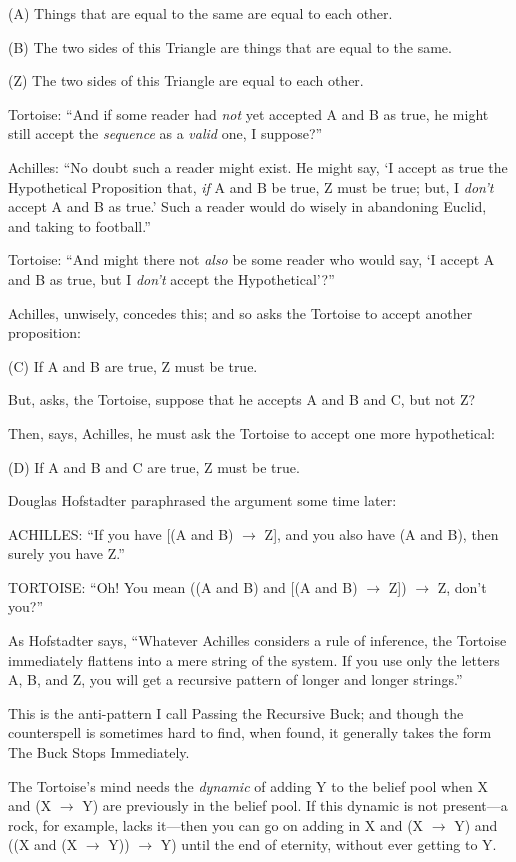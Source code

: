 {
 (A) Things that are equal to the same are equal to each other.}

{
 (B) The two sides of this Triangle are things that are equal to
the same.}

{
 (Z) The two sides of this Triangle are equal to each other.}

{
 Tortoise: ``And if some reader had \textit{not}
yet accepted A and B as true, he might still accept the
\textit{sequence} as a \textit{valid} one, I
suppose?''}

{
 Achilles: ``No doubt such a reader might exist.
He might say, `I accept as true the Hypothetical
Proposition that, \textit{if} A and B be true, Z must be true; but, I
\textit{don't} accept A and B as true.'
Such a reader would do wisely in abandoning Euclid, and taking to
football.''}

{
 Tortoise: ``And might there not \textit{also} be
some reader who would say, `I accept A and B as true,
but I \textit{don't} accept the
Hypothetical'?''}

{
 Achilles, unwisely, concedes this; and so asks the Tortoise to
accept another proposition:}

{
 (C) If A and B are true, Z must be true.}

{
 But, asks, the Tortoise, suppose that he accepts A and B and C,
but not Z?}

{
 Then, says, Achilles, he must ask the Tortoise to accept one more
hypothetical:}

{
 (D) If A and B and C are true, Z must be true.}

{
 Douglas Hofstadter paraphrased the argument some time later:}

{
 ACHILLES: ``If you have [(A and B) $\rightarrow $
Z], and you also have (A and B), then surely you have
Z.''}

{
 TORTOISE: ``Oh! You mean ((A and B) and [(A and
B) $\rightarrow $ Z]) $\rightarrow $ Z, don't
you?''}

{
 As Hofstadter says, ``Whatever Achilles considers
a rule of inference, the Tortoise immediately flattens into a mere
string of the system. If you use only the letters A, B, and Z, you will
get a recursive pattern of longer and longer
strings.''}

{
 This is the anti-pattern I call Passing the Recursive Buck; and
though the counterspell is sometimes hard to find, when found, it
generally takes the form The Buck Stops Immediately.}

{
 The Tortoise's mind needs the \textit{dynamic} of
adding Y to the belief pool when X and (X $\rightarrow $ Y) are
previously in the belief pool. If this dynamic is not present---a rock,
for example, lacks it---then you can go on adding in X and (X
$\rightarrow $ Y) and ((X and (X $\rightarrow $ Y)) $\rightarrow $ Y)
until the end of eternity, without ever getting to Y.}

